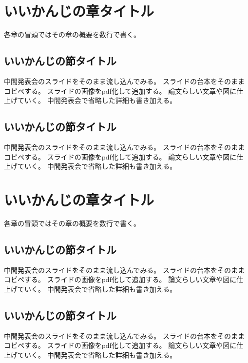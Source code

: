 \documentclass[12pt,a4paper,oneside]{jsbook}
\theoremstyle{plain}
\begin{document}
\chapter{いいかんじの章タイトル}
各章の冒頭ではその章の概要を数行で書く。

\section{いいかんじの節タイトル}
中間発表会のスライドをそのまま流し込んでみる。
スライドの台本をそのままコピペする。
スライドの画像をpdf化して追加する。
論文らしい文章や図に仕上げていく。
中間発表会で省略した詳細も書き加える。

\section{いいかんじの節タイトル}
中間発表会のスライドをそのまま流し込んでみる。
スライドの台本をそのままコピペする。
スライドの画像をpdf化して追加する。
論文らしい文章や図に仕上げていく。
中間発表会で省略した詳細も書き加える。


\chapter{いいかんじの章タイトル}
\label{chapter_3}
各章の冒頭ではその章の概要を数行で書く。

\section{いいかんじの節タイトル}
中間発表会のスライドをそのまま流し込んでみる。
スライドの台本をそのままコピペする。
スライドの画像をpdf化して追加する。
論文らしい文章や図に仕上げていく。
中間発表会で省略した詳細も書き加える。

\section{いいかんじの節タイトル}
中間発表会のスライドをそのまま流し込んでみる。
スライドの台本をそのままコピペする。
スライドの画像をpdf化して追加する。
論文らしい文章や図に仕上げていく。
中間発表会で省略した詳細も書き加える。
\end{document}
